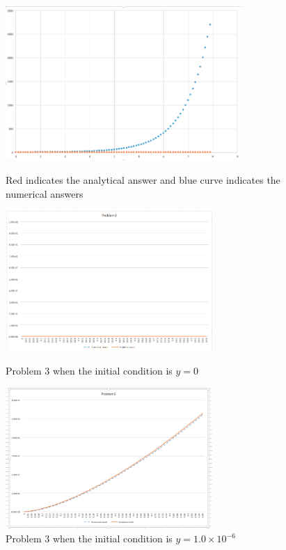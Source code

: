 \documentclass{article}
\begin{document}
 




\begin{figure} 
\includegraphics[width=0.8\textwidth]{problem1}
\centering
\label{fig:des_image}
\caption{Red indicates the analytical answer and blue curve indicates the numerical answers }
\end{figure} 




\begin{figure} 
\includegraphics[width=0.7\textwidth]{problem3_1} 
\centering
\caption{Problem 3 when the initial condition is $y=0$}
\includegraphics[width=0.7\textwidth]{problem3_2} 
\centering
\caption{Problem 3 when the initial condition is $y=1.0\times10^{-6}$}

\end{figure} 

\label{}
\end{document}
